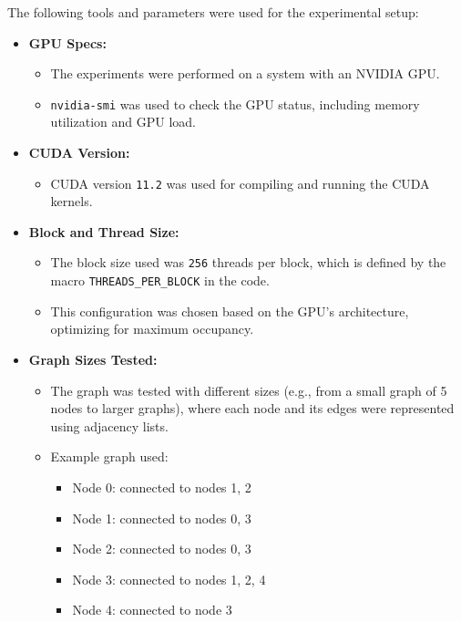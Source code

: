 \documentclass[a4paper,12pt]{article}
\begin{document}
\begin{center}
The following tools and parameters were used for the experimental setup:

\begin{itemize}
    \item \textbf{GPU Specs:} 
    \begin{itemize}
        \item The experiments were performed on a system with an NVIDIA GPU. 
        \item \texttt{nvidia-smi} was used to check the GPU status, including memory utilization and GPU load.
    \end{itemize}
    \item \textbf{CUDA Version:} 
    \begin{itemize}
        \item CUDA version \texttt{11.2} was used for compiling and running the CUDA kernels.
    \end{itemize}
    \item \textbf{Block and Thread Size:}
    \begin{itemize}
        \item The block size used was \texttt{256} threads per block, which is defined by the macro \texttt{THREADS\_PER\_BLOCK} in the code.
        \item This configuration was chosen based on the GPU’s architecture, optimizing for maximum occupancy.
    \end{itemize}
    \item \textbf{Graph Sizes Tested:}
    \begin{itemize}
        \item The graph was tested with different sizes (e.g., from a small graph of 5 nodes to larger graphs), where each node and its edges were represented using adjacency lists.
        \item Example graph used:
        \begin{itemize}
            \item Node 0: connected to nodes 1, 2
            \item Node 1: connected to nodes 0, 3
            \item Node 2: connected to nodes 0, 3
            \item Node 3: connected to nodes 1, 2, 4
            \item Node 4: connected to node 3
        \end{itemize}
    \end{itemize}
\end{itemize}



\end{center}
\end{document}
